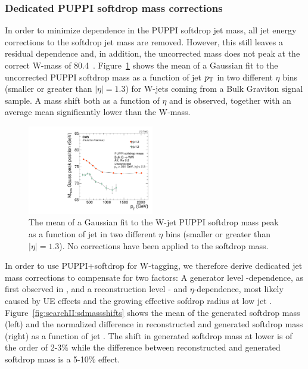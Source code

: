 \subsubsection{Dedicated PUPPI softdrop mass corrections}
\label{sec:searchII:masscorr}
In order to minimize \PT dependence in the PUPPI softdrop jet mass, all jet energy corrections to the softdrop jet mass are removed. However, this still leaves a residual \PT dependence and, in addition, the uncorrected mass does not peak at the correct W-mass of 80.4~\GeV. Figure~\ref{fig:searchII:UncorrSD} shows the mean of a Gaussian fit to the uncorrected PUPPI softdrop mass as a function of jet $p_{\mathrm{T}}$ in two different $\eta$ bins (smaller or greater than $|\eta|=1.3$) for W-jets coming from a Bulk Graviton signal sample. A mass shift both as a function of $\eta$ and \PT is observed, together with an average mean significantly lower than the W-mass.
\begin{figure}[h!]
\centering
\includegraphics[width=0.49\textwidth]{figures/analysis/search2/AN-16-235/plots/RecoPuppiSoftdropMass_vspt.pdf}
\caption{The mean of a Gaussian fit to the W-jet PUPPI softdrop mass peak as a function of jet \PT in two different $\eta$ bins (smaller or greater than $|\eta|=1.3$). No corrections have been applied to the softdrop mass.}
\label{fig:searchII:UncorrSD}
\end{figure}
In order to use PUPPI+softdrop for W-tagging, we therefore derive dedicated jet mass corrections to compensate for two factors: A generator level \PT-dependence, as first observed in \label{sec:searchI:wtagging}, and a reconstruction level \PT- and $\eta$-dependence, most likely caused by UE effects and the growing effective sofdrop radius at low jet \PT. Figure~\ref{fig:searchII:sdmassshifts} shows the mean of the generated softdrop mass (left) and the normalized difference in reconstructed and generated softdrop mass (right) as a function of jet \PT. The shift in generated softdrop mass at lower \PT is of the order of 2-3$\%$ while the difference between reconstructed and generated softdrop mass is a 5-10$\%$ effect.
